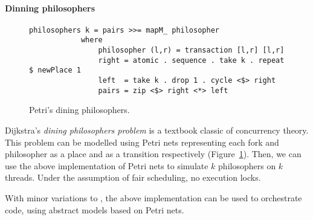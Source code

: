 \paragraph{Dinning philosophers}
\begin{figure}
    \centering
    \begin{Verbatim}[tabsize=3, gobble=2]
        philosophers k = pairs >>= mapM_ philosopher
            where
                philosopher (l,r) = transaction [l,r] [l,r] 
                right = atomic . sequence . take k . repeat $ newPlace 1
                left  = take k . drop 1 . cycle <$> right
                pairs = zip <$> right <*> left
    \end{Verbatim}
\caption{Petri's dining philosophers.}
\label{fig:example-petri-philosophers}
\end{figure}

Dijkstra's \emph{dining philosophers problem} is a textbook
classic of concurrency theory. This problem can be modelled using Petri 
nets representing each fork and philosopher as a place and as a transition
respectively (Figure~\ref{fig:example-petri-philosophers}).
Then, we can use the above implementation of Petri nets to simulate
$k$ philosophers on $k$ threads. Under the assumption of fair scheduling,
no execution locks.

With minor variations to , the above 
implementation can be used to orchestrate code, using 
abstract models based on Petri nets.